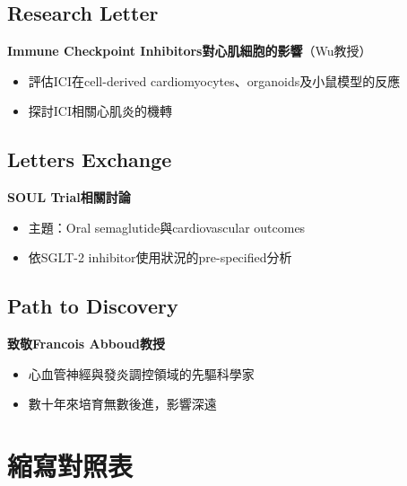 \documentclass[12pt,a4paper]{article}
\begin{document}
\subsection{Research Letter}

\textbf{Immune Checkpoint Inhibitors對心肌細胞的影響}（Wu教授）
\begin{itemize}
    \item 評估ICI在cell-derived cardiomyocytes、organoids及小鼠模型的反應
    \item 探討ICI相關心肌炎的機轉
\end{itemize}

\subsection{Letters Exchange}

\textbf{SOUL Trial相關討論}
\begin{itemize}
    \item 主題：Oral semaglutide與cardiovascular outcomes
    \item 依SGLT-2 inhibitor使用狀況的pre-specified分析
\end{itemize}

\subsection{Path to Discovery}

\textbf{致敬Francois Abboud教授}
\begin{itemize}
    \item 心血管神經與發炎調控領域的先驅科學家
    \item 數十年來培育無數後進，影響深遠
\end{itemize}

\section{縮寫對照表}
\end{document}

